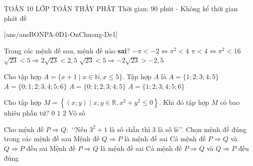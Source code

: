 \begin{name}
	{\tenchude}
	{TOÁN 10}
	{LỚP TOÁN THẦY PHÁT}
	{Thời gian: 90 phút - Không kể thời gian phát đề}
\end{name}
\TN
{}[ans/ansBONPA-0D1-OnChuong-De1]
\begin{ex}%
	Trong các mệnh đề sau, mệnh đề nào \textbf{sai}?
	\choice
	{\True $-\pi<-2\Leftrightarrow\pi^2<4$}
	{$\pi<4\Leftrightarrow\pi^2<16$}
	{$\sqrt{23}<5\Rightarrow2\sqrt{23}<2{,}5$}
	{$\sqrt{23}<5\Rightarrow-2\sqrt{23}>-2{,}5$}
\end{ex}

\begin{ex}%
	Cho tập hợp $A=\{x+1\mid x\in\mathbb{N}, x\le 5\}$. Tập hợp $A$ là
	\choice
	{$A=\{1;2;3;4;5\}$}
	{$A=\{0;1;2;3;4;5;6\}$}
	{$A=\{0;1;2;3;4;5\}$}
	{\True $A=\{1;2;3;4;5;6\}$}
\end{ex}

\begin{ex}%
	Cho tập hợp $M=\left\{(x;y)\mid x,y\in\mathbb{R}, x^2+y^2\le0\right\}$. Khi đó tập hợp $M$ có bao nhiêu phần tử?
	\choice
	{$0$}
	{\True $1$}
	{$2$}
	{Vô số}
\end{ex}

\begin{ex}%
	Cho mệnh đề $P\Rightarrow Q\colon$ \lq\lq Nếu $3^2+1$ là số chẵn thì $3$ là số lẻ\rq\rq . Chọn mệnh đề đúng trong các mệnh đề sau
	\choice
	{Mệnh đề $Q\Rightarrow P$ là mệnh đề sai}
	{Cả mệnh đề $P\Rightarrow Q$ và $Q\Rightarrow P$ đều sai}
	{Mệnh đề $P\Rightarrow Q$ là mệnh đề sai}
	{\True Cả mệnh đề $P\Rightarrow Q$ và $Q\Rightarrow P$ đều đúng}
\end{ex}

